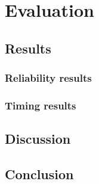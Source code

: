 \chapter{Evaluation}
\section{Results}
\subsection{Reliability results}
\subsection{Timing results}
\section{Discussion}
\section{Conclusion}
